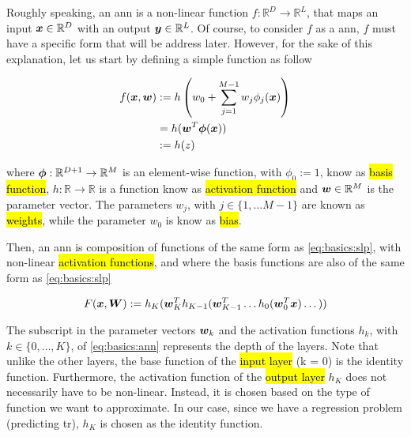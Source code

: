 
\glsresetall

\graphicspath{{./Sections/Basics/Resources/}}


Roughly speaking, an \gls{ann} is a non-linear function $f:\mathbb{R}^D \rightarrow \mathbb{R}^L$, that maps an input $\boldsymbol{x}\in\mathbb{R}^D$ with an output $\boldsymbol{y}\in\mathbb{R}^L$. Of course, to consider $f$ as a \gls{ann}, $f$ must have a specific form that will be address later. However, for the sake of this explanation, let us start by defining a simple function as follow

\begin{equation}
  \begin{split}
    f(\boldsymbol{x},\boldsymbol{w}) &:= h \left(w_0 + \sum_{j=1}^{M-1}w_j\phi_j(\boldsymbol{x}) \right) \\
    &= h(\boldsymbol{w}^T\boldsymbol{\phi}(\boldsymbol{x})) \\
    &:= h(z)
  \end{split}
  \label{eq:basics:slp}
\end{equation}

\noindent where $\boldsymbol{\phi}:\mathbb{R}^{D+1} \rightarrow \mathbb{R}^M$ is an element-wise function, with $\phi_0:=1$, know as \hl{basis function}, $h:\mathbb{R} \rightarrow \mathbb{R}$ is a function know as \hl{activation function} and $\boldsymbol{w}\in\mathbb{R}^M$ is the parameter vector. The parameters $w_j$, with $j\in\{1,\dots M-1\}$ are known as \hl{weights}, while the parameter $w_0$ is know as \hl{bias}.

Then, an \gls{ann} is composition of functions of the same form as \ref{eq:basics:slp}, with non-linear \hl{activation functions}, and where the basis functions are also of the same form as \ref{eq:basics:slp} \cite{bishop2006pattern}

\begin{equation}
  F(\boldsymbol{x}, \boldsymbol{W}) :=
  h_K(\boldsymbol{w}^T_K h_{K-1}(\boldsymbol{w}^T_{K-1} \dots h_{0}(\boldsymbol{w}^T_0 \boldsymbol{x}) \dots ))
  \label{eq:basics:ann}
\end{equation}

The subscript in the parameter vectors $\boldsymbol{w}_k$ and the activation functions $h_k$, with $k\in\{0, \dots, K\}$, of \ref{eq:basics:ann} represents the depth of the layers. Note that unlike the other layers, the base function of the \hl{input layer} (k = 0) is the identity function. Furthermore, the activation function of the \hl{output layer} $h_K$ does not necessarily have to be non-linear. Instead, it is chosen based on the type of function we want to approximate. In our case, since we have a regression problem (predicting \gls{tr}), $h_K$ is chosen as the identity function.

